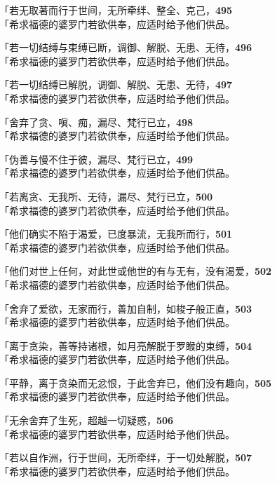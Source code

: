 「若无取著而行于世间，无所牵绊、整全、克己，\hfill{\grayfootnotesize \textbf{495}} \\
「希求福德的婆罗门若欲供奉，应适时给予他们供品。


「若一切结缚与束缚已断，调御、解脱、无患、无待，\hfill{\grayfootnotesize \textbf{496}} \\
「希求福德的婆罗门若欲供奉，应适时给予他们供品。


「若一切结缚已解脱，调御、解脱、无患、无待，\hfill{\grayfootnotesize \textbf{497}} \\
「希求福德的婆罗门若欲供奉，应适时给予他们供品。


「舍弃了贪、嗔、痴，漏尽、梵行已立，\hfill{\grayfootnotesize \textbf{498}} \\
「希求福德的婆罗门若欲供奉，应适时给予他们供品。


「伪善与慢不住于彼，漏尽、梵行已立，\hfill{\grayfootnotesize \textbf{499}} \\
「希求福德的婆罗门若欲供奉，应适时给予他们供品。

「若离贪、无我所、无待，漏尽、梵行已立，\hfill{\grayfootnotesize \textbf{500}} \\
「希求福德的婆罗门若欲供奉，应适时给予他们供品。

「他们确实不陷于渴爱，已度暴流，无我所而行，\hfill{\grayfootnotesize \textbf{501}} \\
「希求福德的婆罗门若欲供奉，应适时给予他们供品。

「他们对世上任何，对此世或他世的有与无有，没有渴爱，\hfill{\grayfootnotesize \textbf{502}} \\
「希求福德的婆罗门若欲供奉，应适时给予他们供品。


「舍弃了爱欲，无家而行，善加自制，如梭子般正直，\hfill{\grayfootnotesize \textbf{503}} \\
「希求福德的婆罗门若欲供奉，应适时给予他们供品。

「离于贪染，善等持诸根，如月亮解脱于罗睺的束缚，\hfill{\grayfootnotesize \textbf{504}} \\
「希求福德的婆罗门若欲供奉，应适时给予他们供品。

「平静，离于贪染而无忿恨，于此舍弃已，他们没有趣向，\hfill{\grayfootnotesize \textbf{505}} \\
「希求福德的婆罗门若欲供奉，应适时给予他们供品。


「无余舍弃了生死，超越一切疑惑，\hfill{\grayfootnotesize \textbf{506}} \\
「希求福德的婆罗门若欲供奉，应适时给予他们供品。

「若以自作洲，行于世间，无所牵绊，于一切处解脱，\hfill{\grayfootnotesize \textbf{507}} \\
「希求福德的婆罗门若欲供奉，应适时给予他们供品。



